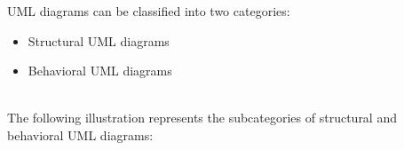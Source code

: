 

UML diagrams can be classified into two categories:

\begin{itemize}
\item
Structural UML diagrams
\item
Behavioral UML diagrams
\end{itemize}
\\
The following illustration represents the subcategories of structural and behavioral UML diagrams:

\begin{center}
\end{center}

